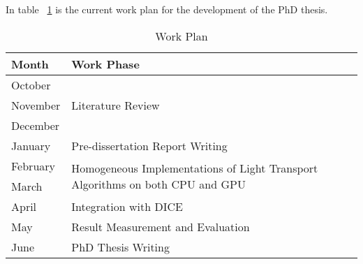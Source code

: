 
In table ~\ref{tab:work_plan} is the current work plan for the development of the PhD thesis.

\begin{table}[h]
\centering
\begin{tabular}{|l|l|}
\hline
\textbf{Month} & \textbf{Work Phase} \\ \hline
October & \multirow{3}{*}{Literature Review} \\ \cline{1-1}
November &  \\ \cline{1-1}
December &  \\ \hline
January & Pre-dissertation Report Writing \\ \hline
February & \multirow{2}{*}{Homogeneous Implementations of Light Transport Algorithms on both CPU and GPU} \\ \cline{1-1}
March &  \\ \hline
April & Integration with DICE \\ \hline
May & Result Measurement and Evaluation \\ \hline
June & PhD Thesis Writing \\ \hline
\end{tabular}
\caption{\label{tab:work_plan} Work Plan}
\end{table}
